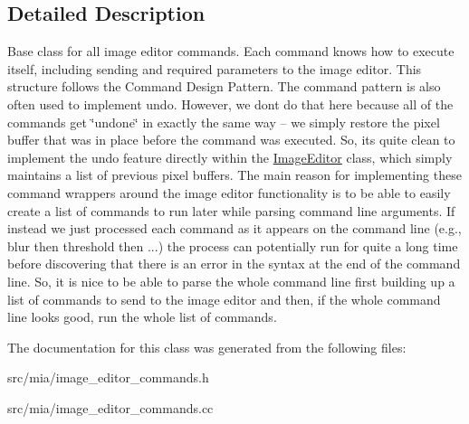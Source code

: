\subsection{Detailed Description}
Base class for all image editor commands. Each command knows how to execute itself, including sending and required parameters to the image editor. This structure follows the Command Design Pattern. The command pattern is also often used to implement undo. However, we don\textquotesingle{}t do that here because all of the commands get \char`\"{}undone\char`\"{} in exactly the same way -- we simply restore the pixel buffer that was in place before the command was executed. So, it\textquotesingle{}s quite clean to implement the undo feature directly within the \hyperlink{classimage__tools_1_1ImageEditor}{Image\+Editor} class, which simply maintains a list of previous pixel buffers. The main reason for implementing these command wrappers around the image editor functionality is to be able to easily create a list of commands to run later while parsing command line arguments. If instead we just processed each command as it appears on the command line (e.\+g., blur then threshold then ...) the process can potentially run for quite a long time before discovering that there is an error in the syntax at the end of the command line. So, it is nice to be able to parse the whole command line first building up a list of commands to send to the image editor and then, if the whole command line looks good, run the whole list of commands. 

The documentation for this class was generated from the following files\+:\begin{DoxyCompactItemize}
\item 
src/mia/image\+\_\+editor\+\_\+commands.\+h\item 
src/mia/image\+\_\+editor\+\_\+commands.\+cc\end{DoxyCompactItemize}
